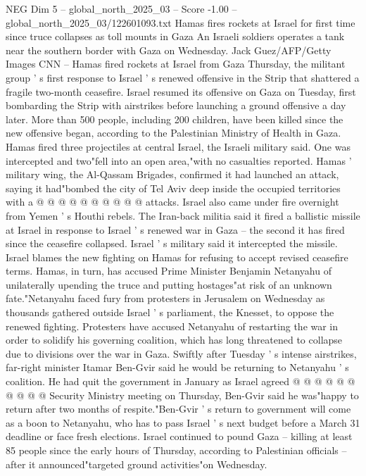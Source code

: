 \begin{textsample}{NEG Dim 5 – global\_north\_2025\_03 – Score -1.00 – global\_north\_2025\_03/122601093.txt}  \label{ex:f5_neg_294}
Hamas fires rockets at Israel for first time since truce collapses as toll mounts in Gaza An Israeli soldiers operates a tank near the southern border with Gaza on Wednesday.
Jack Guez/AFP/Getty Images CNN -- Hamas fired rockets at Israel from Gaza Thursday, the militant group ' s first response to Israel ' s renewed offensive in the Strip that shattered a fragile two-month ceasefire.
Israel resumed its offensive on Gaza on Tuesday, first bombarding the Strip with airstrikes before launching a ground offensive a day later.
More than 500 people, including 200 children, have been killed since the new offensive began, according to the Palestinian Ministry of Health in Gaza.
Hamas fired three projectiles at central Israel, the Israeli military said.
One was intercepted and two"fell into an open area,"with no casualties reported.
Hamas ' military wing, the Al-Qassam Brigades, confirmed it had launched an attack, saying it had"bombed the city of Tel Aviv deep inside the occupied territories with a @ @ @ @ @ @ @ @ @ @ attacks.
Israel also came under fire overnight from Yemen ' s Houthi rebels.
The Iran-back militia said it fired a ballistic missile at Israel in response to Israel ' s renewed war in Gaza -- the second it has fired since the ceasefire collapsed.
Israel ' s military said it intercepted the missile.
Israel blames the new fighting on Hamas for refusing to accept revised ceasefire terms.
Hamas, in turn, has accused Prime Minister Benjamin Netanyahu of unilaterally upending the truce and putting hostages"at risk of an unknown fate."Netanyahu faced fury from protesters in Jerusalem on Wednesday as thousands gathered outside Israel ' s parliament, the Knesset, to oppose the renewed fighting.
Protesters have accused Netanyahu of restarting the war in order to solidify his governing coalition, which has long threatened to collapse due to divisions over the war in Gaza.
Swiftly after Tuesday ' s intense airstrikes, far-right minister Itamar Ben-Gvir said he would be returning to Netanyahu ' s coalition.
He had quit the government in January as Israel agreed @ @ @ @ @ @ @ @ @ @ Security Ministry meeting on Thursday, Ben-Gvir said he was"happy to return after two months of respite."Ben-Gvir ' s return to government will come as a boon to Netanyahu, who has to pass Israel ' s next budget before a March 31 deadline or face fresh elections.
Israel continued to pound Gaza -- killing at least 85 people since the early hours of Thursday, according to Palestinian officials -- after it announced"targeted ground activities"on Wednesday.

\end{textsample}
